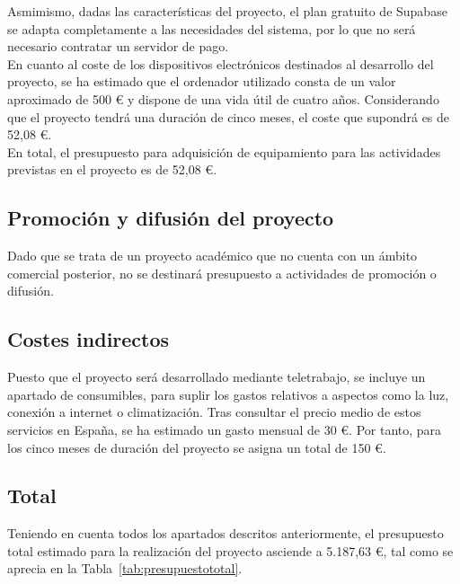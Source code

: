 Asmimismo, dadas las características del proyecto, el plan gratuito de Supabase se adapta completamente a las necesidades del sistema, por lo que no será necesario contratar un servidor de pago. \\

En cuanto al coste de los dispositivos electrónicos destinados al desarrollo del proyecto, se ha estimado que el ordenador utilizado consta de un valor aproximado de 500 € y dispone de una vida útil de cuatro años. Considerando que el proyecto tendrá una duración de cinco meses, el coste que supondrá es de 52,08 €. \\

En total, el presupuesto para adquisición de equipamiento para las actividades previstas en el proyecto es de 52,08 €.


\subsection{Promoción y difusión del proyecto}

Dado que se trata de un proyecto académico que no cuenta con un ámbito comercial posterior, no se destinará presupuesto a actividades de promoción o difusión.

\subsection{Costes indirectos}

Puesto que el proyecto será desarrollado mediante teletrabajo, se incluye un apartado de consumibles, para suplir los gastos relativos a aspectos como la luz, conexión a internet o climatización. Tras consultar el precio medio de estos servicios en España, se ha estimado un gasto mensual de 30 €. Por tanto, para los cinco meses de duración del proyecto se asigna un total de 150 €.

\subsection{Total}

Teniendo en cuenta todos los apartados descritos anteriormente, el presupuesto total estimado para la realización del proyecto asciende a 5.187,63 €, tal como se aprecia en la Tabla~\ref{tab:presupuestototal}. \\

